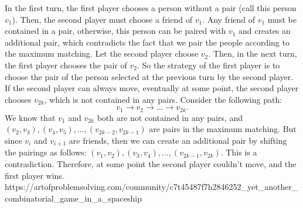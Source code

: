 {    In the first turn, the first player chooses a person without a pair (call this person $v_1$). Then, the second player must choose a friend of $v_1$. Any friend of $v_1$ must be contained in a pair, otherwise, this person can be paired with $v_1$ and creates an additional pair, which contradicts the fact that we pair the people according to the maximum matching. Let the second player choose $v_2$. Then, in the next turn, the first player chooses the pair of $v_2$. So the strategy of the first player is to choose the pair of the person selected at the previous turn by the second player. If the second player can always move, eventually at some point, the second player chooses $v_{2k}$, which is not contained in any pairs. Consider the following path:
    \[ v_1 \rightarrow v_2 \rightarrow \dots \rightarrow v_{2k}. \]We know that $v_1$ and $v_{2k}$ both are not contained in any pairs, and $(v_2, v_3), (v_4, v_5), \dots, (v_{2k-2}, v_{2k-1})$ are pairs in the maximum matching. But since $v_i$ and $v_{i+1}$ are friends, then we can create an additional pair by shifting the pairings as follows: $(v_1, v_2), (v_3, v_4), \dots, (v_{2k-1}, v_{2k})$. This is a contradiction. Therefore, at some point the second player couldn't move, and the first player wins.
    }{%
    https://artofproblemsolving.com/community/c7t45487f7h2846252_yet_another_combinatorial_game_in_a_spaceship
}
